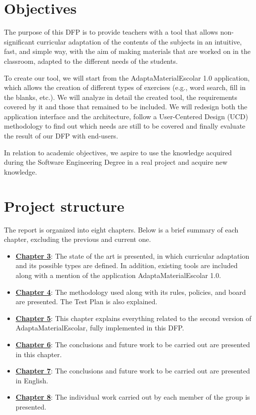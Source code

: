 \section{Objectives}\label{cap:objetives}
The purpose of this DFP is to provide teachers with a tool that allows non-significant curricular adaptation of the contents of the subjects in an intuitive, fast, and simple way, with the aim of making materials that are worked on in the classroom, adapted to the different needs of the students.

To create our tool, we will start from the AdaptaMaterialEscolar 1.0 application, which allows the creation of different types of exercises (e.g., word search, fill in the blanks, etc.). We will analyze in detail the created tool, the requirements covered by it and those that remained to be included. We will redesign both the application interface and the architecture, follow a  User-Centered Design (UCD) methodology to find out which needs are still to be covered and finally evaluate the result of our DFP with end-users.

In relation to academic objectives, we aspire to use the knowledge acquired during the Software Engineering Degree in a real project and acquire new knowledge.

\section{Project structure}\label{cap:Projectstructure}
The report is organized into eight chapters. Below is a brief summary of each chapter, excluding the previous and current one.
\begin{itemize}
\item \textbf{\hyperref[cap:estadoDelArte]{Chapter 3}}: The state of the art is presented, in which curricular adaptation and its possible types are defined. In addition, existing tools are included along with a mention of the application AdaptaMaterialEscolar 1.0.
\item \textbf{\hyperref[cap:metodologia]{Chapter 4}}: The methodology used along with its rules, policies, and board are presented. The Test Plan is also explained.
\item \textbf{\hyperref[cap:AdaptaMaterialEscolar2.0]{Chapter 5}}: This chapter explains everything related to the second version of AdaptaMaterialEscolar, fully implemented in this DFP.
\item \textbf{\hyperref[cap:conclusiones]{Chapter 6}}: The conclusions and future work to be carried out are presented in this chapter.
\item \textbf{\hyperref[cap:conclusions]{Chapter 7}}: The conclusions and future work to be carried out are presented in English.
\item \textbf{\hyperref[cap:TrabajoIndividual]{Chapter 8}}: The individual work carried out by each member of the group is presented.
\end{itemize}